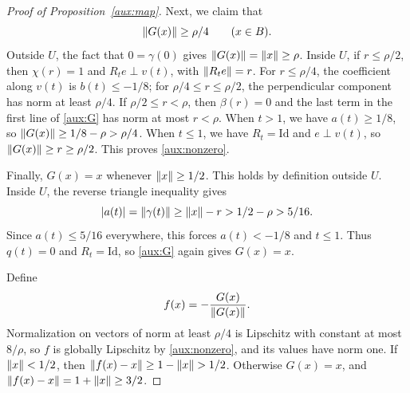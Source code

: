 \begin{proof}[Proof of Proposition~\ref{aux:map}]
Next, we claim that
\begin{equation}\label{aux:nonzero}
 \lVert G(x)\rVert\ge\rho/4\qquad(x\in B).
\end{equation}
Outside $U$, the fact that $0=\gamma(0)$ gives
$\lVert G(x)\rVert=\lVert x\rVert\ge\rho$. Inside $U$, if $r\le\rho/2$, then
$\chi(r)=1$ and $R_te\perp v(t)$, with $\lVert R_te\rVert=r$. For
$r\le\rho/4$, the coefficient along $v(t)$ is $b(t)\le-1/8$;
for $\rho/4\le r\le\rho/2$, the perpendicular component has norm
at least $\rho/4$. If $\rho/2\le r<\rho$, then $\beta(r)=0$ and
the last term in the first line of \eqref{aux:G} has norm at most
$r<\rho$. When $t>1$, we have $a(t)\ge1/8$, so
$\lVert G(x)\rVert\ge1/8-\rho>\rho/4$. When $t\le1$, we have
$R_t=\mathrm{Id}$ and $e\perp v(t)$, so
$\lVert G(x)\rVert\ge r\ge\rho/2$. This proves \eqref{aux:nonzero}.

Finally, $G(x)=x$ whenever $\lVert x\rVert\ge1/2$. This holds by definition
outside $U$. Inside $U$, the reverse triangle inequality gives
\[
 |a(t)|=\lVert \gamma(t)\rVert\ge\lVert x\rVert-r>1/2-\rho>5/16.
\]
Since $a(t)\le5/16$ everywhere, this forces $a(t)<-1/8$ and $t\le1$.
Thus $q(t)=0$ and $R_t=\mathrm{Id}$, so \eqref{aux:G} again gives
$G(x)=x$.

Define
\[
 f(x)=-\frac{G(x)}{\lVert G(x)\rVert}.
\]
Normalization on vectors of norm at least $\rho/4$ is Lipschitz with
constant at most $8/\rho$, so $f$ is globally Lipschitz by
\eqref{aux:nonzero}, and its values have norm one. If
$\lVert x\rVert<1/2$, then $\lVert f(x)-x\rVert\ge1-\lVert x\rVert>1/2$.
Otherwise $G(x)=x$, and
$\lVert f(x)-x\rVert=1+\lVert x\rVert\ge3/2$.
\end{proof}
